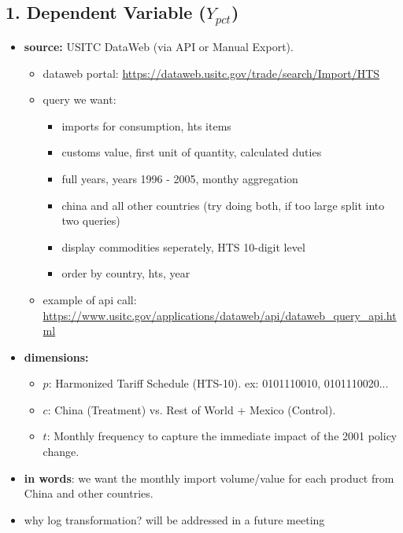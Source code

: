 \documentclass[12pt]{article}
\begin{document}
\subsection*{1. Dependent Variable ($Y_{pct}$)}
\begin{itemize}
    \item \textbf{source:} USITC DataWeb (via API or Manual Export).
          \begin{itemize}
              \item dataweb portal: \url{https://dataweb.usitc.gov/trade/search/Import/HTS}
              \item query we want:
                    \begin{itemize}
                        \item imports for consumption, hts items
                        \item customs value, first unit of quantity, calculated duties
                        \item full years, years 1996 - 2005, monthy aggregation
                        \item china and all other countries (try doing both, if too large split into two queries)
                        \item display commodities seperately, HTS 10-digit level
                        \item order by country, hts, year
                    \end{itemize}
              \item example of api call: \url{https://www.usitc.gov/applications/dataweb/api/dataweb_query_api.html}
          \end{itemize}
    \item \textbf{dimensions:}
          \begin{itemize}
              \item $p$: Harmonized Tariff Schedule (HTS-10). ex: 0101110010, 0101110020...
              \item $c$: China (Treatment) vs. Rest of World + Mexico (Control).
              \item $t$: Monthly frequency to capture the immediate impact of the 2001 policy change.
          \end{itemize}
    \item \textbf{in words}: we want the monthly import volume/value for each product from China and other countries.
    \item why log transformation? will be addressed in a future meeting
\end{itemize}
\end{document}
